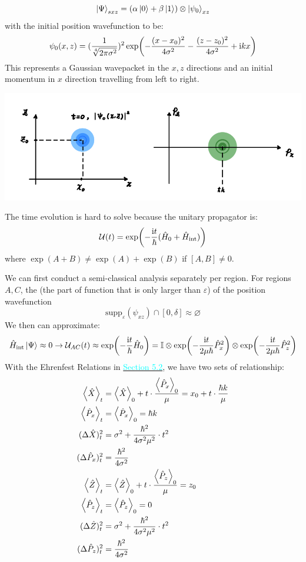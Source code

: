 $$\ket{\Psi}_{sxz} = (\alpha \ket{0} + \beta \ket{1}) \otimes \ket{\psi_0}_{xz}$$
with the initial position wavefunction to be:
$$\psi_0(x, z) = (\frac{1}{\sqrt[4]{2\pi\sigma^2}})^2\exp(-\frac{(x-x_0)^2}{4\sigma^2}-\frac{(z-z_0)^2}{4\sigma^2}+\mathrm{i} k x)$$
This represents a Gaussian wavepacket in the $x,z$ directions and an initial momentum in $x$ direction travelling from left to right.
\begin{center}
    \includegraphics[scale = 1]{stern-gerlach-initial.png}
\end{center}
The time evolution is hard to solve because the unitary propagator is:
$$\mathcal{U}(t) = \exp(-\frac{\mathrm{i} t}{\hbar}(\hat{H}_0 + \hat{H}_{\text{int}}))$$
where $\exp(A+B) \ne \exp(A) + \exp(B)$ if $[A, B] \ne 0$. \par
We can first conduct a semi-classical analysis separately per region. For regions $A, C$, the  (the part of function that is only larger than $\varepsilon$) of the position wavefunction
$$\text{supp}_\varepsilon(\psi_{xz}) \cap [0, \delta] \approx \varnothing$$
We then can approximate:
$$\hat{H}_{\text{int}} \ket{\Psi} \approx 0 \to \mathcal{U}_{AC}(t) \approx \exp(-\frac{\mathrm{i} t}{\hbar}\hat{H}_0) = \mathbb{I} \otimes \exp(-\frac{\mathrm{i} t}{2\mu\hbar}\hat{P}_x^2) \otimes \exp(-\frac{\mathrm{i} t}{2\mu\hbar}\hat{P}_z^2)$$
With the Ehrenfest Relations in \hyperref[subsec:ehrenfest]{\textcolor{cyan}{Section 5.2}}, we have two sets of relationship:
\begin{align*}
    \expval{\hat{X}}_t &= \expval{\hat{X}}_0 + t \cdot \frac{\expval{\hat{P}_x}_0}{\mu} = x_0 + t \cdot \frac{\hbar k}{\mu} \\
    \expval{\hat{P}_x}_t &= \expval{\hat{P}_x}_0= \hbar k \\
    (\Delta \hat{X})_t^2 &= \sigma^2 + \frac{\hbar^2}{4\sigma^2\mu^2} \cdot t^2 \\
    (\Delta \hat{P}_x)_t^2 &= \frac{\hbar^2}{4\sigma^2} \\
    \expval{\hat{Z}}_t &= \expval{\hat{Z}}_0 + t \cdot \frac{\expval{\hat{P}_z}_0}{\mu} = z_0 \\
    \expval{\hat{P}_z}_t &= \expval{\hat{P}_z}_0= 0 \\
    (\Delta \hat{Z})_t^2 &= \sigma^2 + \frac{\hbar^2}{4\sigma^2\mu^2} \cdot t^2 \\
    (\Delta \hat{P}_z)_t^2 &= \frac{\hbar^2}{4\sigma^2}
\end{align*}
